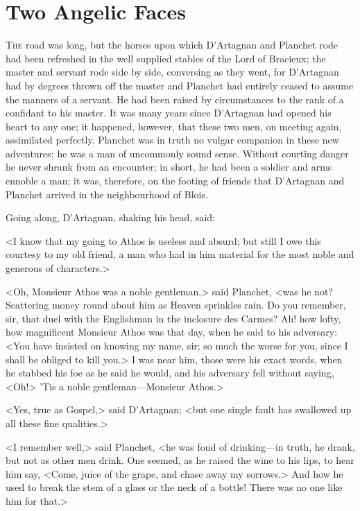 \chapter{Two Angelic Faces}

 \lettrine{T}{he} road was long, but the horses upon which D'Artagnan and Planchet rode had been refreshed in the well supplied stables of the Lord of Bracieux; the master and servant rode side by side, conversing as they went, for D'Artagnan had by degrees thrown off the master and Planchet had entirely ceased to assume the manners of a servant. He had been raised by circumstances to the rank of a confidant to his master. It was many years since D'Artagnan had opened his heart to any one; it happened, however, that these two men, on meeting again, assimilated perfectly. Planchet was in truth no vulgar companion in these new adventures; he was a man of uncommonly sound sense. Without courting danger he never shrank from an encounter; in short, he had been a soldier and arms ennoble a man; it was, therefore, on the footing of friends that D'Artagnan and Planchet arrived in the neighbourhood of Blois.

Going along, D'Artagnan, shaking his head, said:

<I know that my going to Athos is useless and absurd; but still I owe this courtesy to my old friend, a man who had in him material for the most noble and generous of characters.>

<Oh, Monsieur Athos was a noble gentleman,> said Planchet, <was he not? Scattering money round about him as Heaven sprinkles rain. Do you remember, sir, that duel with the Englishman in the inclosure des Carmes? Ah! how lofty, how magnificent Monsieur Athos was that day, when he said to his adversary: <You have insisted on knowing my name, sir; so much the worse for you, since I shall be obliged to kill you.> I was near him, those were his exact words, when he stabbed his foe as he said he would, and his adversary fell without saying, <Oh!> 'Tis a noble gentleman—Monsieur Athos.>

<Yes, true as Gospel,> said D'Artagnan; <but one single fault has swallowed up all these fine qualities.>

<I remember well,> said Planchet, <he was fond of drinking—in truth, he drank, but not as other men drink. One seemed, as he raised the wine to his lips, to hear him say, <Come, juice of the grape, and chase away my sorrows.> And how he used to break the stem of a glass or the neck of a bottle! There was no one like him for that.>

